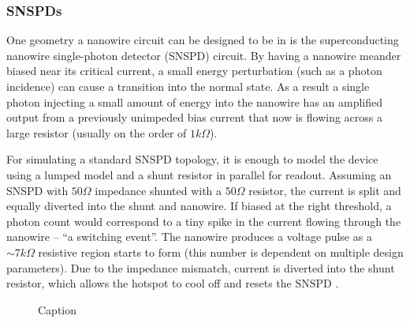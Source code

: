 \documentclass[]{article}
\newcommand{\todoref}[2][]{}
\newcommand{\todoidea}[2][]{}
\newcommand{\todo}[2][]{}
\begin{document}
\todo[]{CPW GEOM}

\todoidea[inline]{CPW geometry}

\subsubsection{SNSPDs}

One geometry a nanowire circuit can be designed to be in is the superconducting nanowire 
single-photon detector (SNSPD) circuit. By having a nanowire meander biased near
its critical current, a small energy perturbation (such as a photon incidence)
can cause a transition into the normal state. As a result a single photon injecting
a small amount of energy into the nanowire has an amplified output from a previously
unimpeded bias 
current that now is flowing across a large resistor (usually on the order of 
$1k\Omega$).\todoref{refernece for snspds}

For simulating a standard SNSPD topology, it is enough to model the device using a lumped model
and a shunt resistor in parallel for readout.
Assuming an SNSPD with $50\Omega$ impedance shunted with a $50\Omega$ resistor, the current is split and equally diverted into the shunt and nanowire.
If biased at the right threshold, a photon count would correspond to a tiny spike in 
the current flowing through the nanowire -- ``a switching event''. The nanowire 
produces a voltage pulse as a $\sim 7k\Omega$ resistive region starts to form 
(this number is dependent on
multiple design parameters). Due to the impedance mismatch,
current is diverted into the shunt resistor, which allows the hotspot to cool off
and resets the SNSPD \cite{toomey_thesis}.

\todo[]{maybe the classic hotspot figure?}

\begin{figure}
    \centering
    \caption{Caption}
    \label{fig:typical}
\end{figure}
\end{document}
